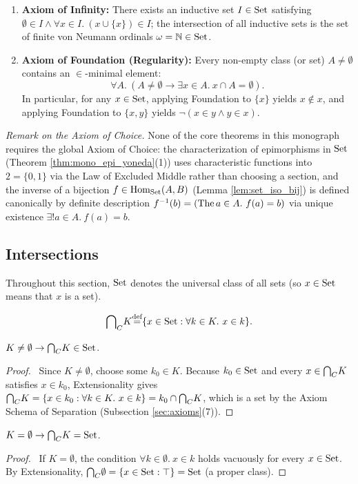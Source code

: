 \documentclass[10pt,a4paper]{article}
\renewcommand{\myprf}{\begin{proof}}
\renewcommand{\myqed}{\end{proof}}
\begin{document}
\begin{enumerate}
\item \textbf{Axiom of Infinity:} There exists an inductive set $I \in {\textrm{Set}}$ satisfying $\emptyset \in I \land \forall x \in I.\ (x \cup \{x\}) \in I$; the intersection of all inductive sets is the set of finite von Neumann ordinals $\omega = \mathbb{N} \in {\textrm{Set}}$.
\item \textbf{Axiom of Foundation (Regularity):} Every non-empty class (or set) $A \neq \emptyset$ contains an $\in$-minimal element:
$$\forall A.\ (A \neq \emptyset \to \exists x \in A.\ x \cap A = \emptyset).$$
In particular, for any $x \in {\textrm{Set}}$, applying Foundation to $\{x\}$ yields $x \notin x$, and applying Foundation to $\{x, y\}$ yields $\neg(x \in y \land y \in x)$.
\end{enumerate}
\emph{Remark on the Axiom of Choice.} None of the core theorems in this monograph requires the global Axiom of Choice: the characterization of epimorphisms in ${\textrm{Set}}$ (Theorem \ref{thm:mono_epi_yoneda}(1)) uses characteristic functions into $2 = \{0, 1\}$ via the Law of Excluded Middle rather than choosing a section, and the inverse of a bijection $f \in {\textrm{Hom}}_{\textrm{Set}}(A, B)$ (Lemma \ref{lem:set_iso_bij}) is defined canonically by definite description $f^{-1}(b) = ({\textrm{The\,}} a \in A.\ f(a) = b)$ via unique existence $\exists !a \in A.\ f(a) = b$.

\subsection{Intersections}\label{sec:intersections}
Throughout this section, ${\textrm{Set}}$ denotes the universal class of all sets (so $x \in {\textrm{Set}}$ means that $x$ is a set).

\begin{definition}
$${{\bigcap}_C} K {\stackrel{{\textrm{def}}}{=}} \{x \in {\textrm{Set}} : \forall k\in K.\ x\in k\}.$$
\end{definition}

\begin{exercise}\label{ex:interclass_set}
$K\neq \emptyset \to {{\bigcap}_C} K \in {\textrm{Set}}$.
\end{exercise}
\myprf\ Since $K \neq \emptyset$, choose some $k_0 \in K$. Because $k_0 \in {\textrm{Set}}$ and every $x \in {{\bigcap}_C} K$ satisfies $x \in k_0$, Extensionality gives ${{\bigcap}_C} K = \{x \in k_0 : \forall k\in K.\ x\in k\} = k_0 \cap {{\bigcap}_C} K$, which is a set by the Axiom Schema of Separation (Subsection \ref{sec:axioms}(7)). \myqed

\begin{exercise}
$K=\emptyset \to {{\bigcap}_C} K = {\textrm{Set}}$.
\end{exercise}
\myprf\ If $K = \emptyset$, the condition $\forall k \in \emptyset.\ x \in k$ holds vacuously for every $x \in {\textrm{Set}}$. By Extensionality, ${{\bigcap}_C} \emptyset = \{x \in {\textrm{Set}} : \top\} = {\textrm{Set}}$ (a proper class). \myqed
\end{document}
